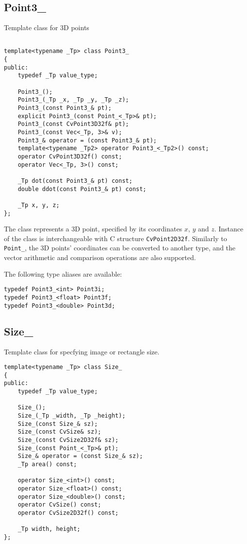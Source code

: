 \subsection{Point3\_}

Template class for 3D points

\begin{lstlisting}

template<typename _Tp> class Point3_
{
public:
    typedef _Tp value_type;
    
    Point3_();
    Point3_(_Tp _x, _Tp _y, _Tp _z);
    Point3_(const Point3_& pt);
    explicit Point3_(const Point_<_Tp>& pt);
    Point3_(const CvPoint3D32f& pt);
    Point3_(const Vec<_Tp, 3>& v);
    Point3_& operator = (const Point3_& pt);
    template<typename _Tp2> operator Point3_<_Tp2>() const;
    operator CvPoint3D32f() const;
    operator Vec<_Tp, 3>() const;

    _Tp dot(const Point3_& pt) const;
    double ddot(const Point3_& pt) const;
    
    _Tp x, y, z;
};
\end{lstlisting}

The class represents a 3D point, specified by its coordinates $x$, $y$ and $z$.
Instance of the class is interchangeable with C structure \texttt{CvPoint2D32f}. Similarly to \texttt{Point\_}, the 3D points' coordinates can be converted to another type, and the vector arithmetic and comparison operations are also supported.

The following type aliases are available:

\begin{lstlisting}
typedef Point3_<int> Point3i;
typedef Point3_<float> Point3f;
typedef Point3_<double> Point3d;
\end{lstlisting}

\subsection{Size\_}

Template class for specfying image or rectangle size.

\begin{lstlisting}
template<typename _Tp> class Size_
{
public:
    typedef _Tp value_type;
    
    Size_();
    Size_(_Tp _width, _Tp _height);
    Size_(const Size_& sz);
    Size_(const CvSize& sz);
    Size_(const CvSize2D32f& sz);
    Size_(const Point_<_Tp>& pt);
    Size_& operator = (const Size_& sz);
    _Tp area() const;

    operator Size_<int>() const;
    operator Size_<float>() const;
    operator Size_<double>() const;
    operator CvSize() const;
    operator CvSize2D32f() const;

    _Tp width, height;
};
\end{lstlisting}

